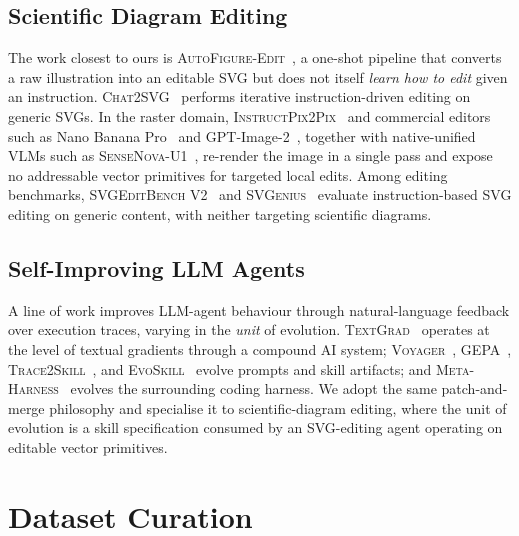 \documentclass[11pt]{article}
\begin{document}
\subsection{Scientific Diagram Editing}
\label{sec:rw-editing}

The work closest to ours is
\textsc{AutoFigure-Edit}~\citep{lin2026autofigure}, a one-shot
pipeline that converts a raw illustration into an editable SVG but
does not itself \emph{learn how to edit} given an instruction.
\textsc{Chat2SVG}~\citep{wu2025chat2svg} performs iterative
instruction-driven editing on generic SVGs.  In the raster domain,
\textsc{InstructPix2Pix}~\citep{brooks2023instructpix2pix} and
commercial editors such as Nano
Banana Pro~\citep{google2025nanobanana} and
GPT-Image-2~\citep{openai2025gptimage}, together with
native-unified VLMs such as
\textsc{SenseNova-U1}~\citep{diao2026sensenova}, re-render the
image in a single pass and expose no addressable vector primitives
for targeted local edits.  Among editing benchmarks,
\textsc{SVGEditBench V2}~\cite{nishina2025svgeditbench} and
\textsc{SVGenius}~\cite{chen2025svgenius} evaluate instruction-based
SVG editing on generic content, with neither targeting scientific
diagrams.

\subsection{Self-Improving LLM Agents}
\label{sec:rw-self-improving}

A line of work improves LLM-agent behaviour through
natural-language feedback over execution traces, varying in the
\emph{unit} of evolution.
\textsc{TextGrad}~\cite{yuksekgonul2024textgradautomaticdifferentiationtext} operates at the
level of textual gradients through a compound AI system;
\textsc{Voyager}~\citep{wang2023voyager},
\textsc{GEPA}~\citep{agrawal2025gepa},
\textsc{Trace2Skill}~\citep{ni2026trace2skill}, and
\textsc{EvoSkill}~\citep{alzubi2026evoskill} evolve prompts and
skill artifacts; and
\textsc{Meta-Harness}~\citep{lee2026meta} evolves the
surrounding coding harness.
We adopt the same patch-and-merge philosophy and specialise it to
scientific-diagram editing, where the unit of evolution is a skill
specification consumed by an SVG-editing agent operating on
editable vector primitives.

\section{Dataset Curation}
\label{sec:dataset}
\end{document}
